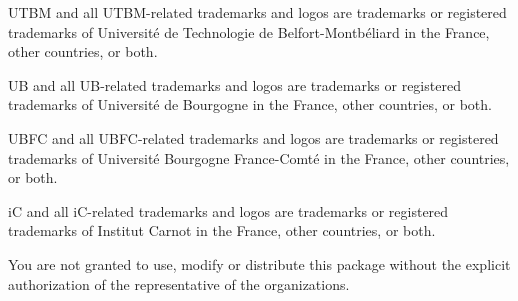 \documentclass[article]{upmethodology-document}
\begin{document}
UTBM and all UTBM-related trademarks and logos are trademarks or registered trademarks of Universit\'e de Technologie de Belfort-Montb\'eliard in the France, other countries, or both.

UB and all UB-related trademarks and logos are trademarks or registered trademarks of Universit\'e de Bourgogne in the France, other countries, or both.

UBFC and all UBFC-related trademarks and logos are trademarks or registered trademarks of Universit\'e Bourgogne France-Comt\'e in the France, other countries, or both.

iC and all iC-related trademarks and logos are trademarks or registered trademarks of Institut Carnot in the France, other countries, or both.

You are not granted to use, modify or distribute this package without the explicit authorization of the representative of the organizations.
\end{document}
